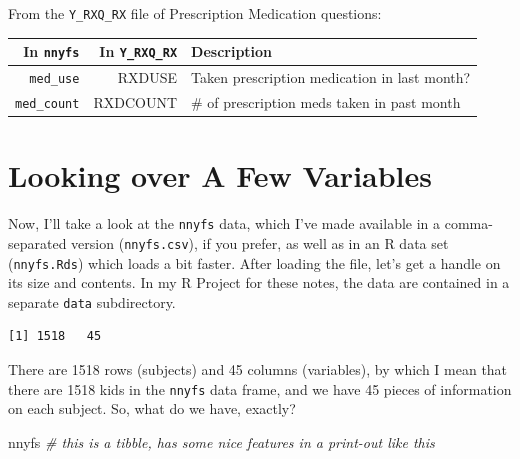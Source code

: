 \documentclass[
]{book}
\newenvironment{Shaded}{\begin{snugshade}}{\end{snugshade}}
\newcommand{\CommentTok}[1]{\textcolor[rgb]{0.56,0.35,0.01}{\textit{#1}}}
\newcommand{\KeywordTok}[1]{\textcolor[rgb]{0.13,0.29,0.53}{\textbf{#1}}}
\newcommand{\NormalTok}[1]{#1}
\newcommand{\OperatorTok}[1]{\textcolor[rgb]{0.81,0.36,0.00}{\textbf{#1}}}
\newcommand{\StringTok}[1]{\textcolor[rgb]{0.31,0.60,0.02}{#1}}
\begin{document}
From the \texttt{Y\_RXQ\_RX} file of Prescription Medication questions:

\begin{longtable}[]{@{}rrl@{}}
\toprule
In \texttt{nnyfs} & In \texttt{Y\_RXQ\_RX} & Description\tabularnewline
\midrule
\endhead
\texttt{med\_use} & RXDUSE & Taken prescription medication in last month?\tabularnewline
\texttt{med\_count} & RXDCOUNT & \# of prescription meds taken in past month\tabularnewline
\bottomrule
\end{longtable}

\hypertarget{looking-over-a-few-variables}{%
\section{Looking over A Few Variables}\label{looking-over-a-few-variables}}

Now, I'll take a look at the \texttt{nnyfs} data, which I've made available in a comma-separated version (\texttt{nnyfs.csv}), if you prefer, as well as in an R data set (\texttt{nnyfs.Rds}) which loads a bit faster. After loading the file, let's get a handle on its size and contents. In my R Project for these notes, the data are contained in a separate \texttt{data} subdirectory.

\begin{Shaded}
\end{Shaded}

\begin{verbatim}
[1] 1518   45
\end{verbatim}

There are 1518 rows (subjects) and 45 columns (variables), by which I mean that there are 1518 kids in the \texttt{nnyfs} data frame, and we have 45 pieces of information on each subject.
So, what do we have, exactly?

\begin{Shaded}
\begin{Highlighting}[]
\NormalTok{nnyfs }\CommentTok{# this is a tibble, has some nice features in a print-out like this}
\end{Highlighting}
\end{Shaded}
\end{document}
